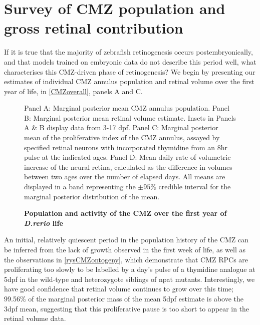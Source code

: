 \section{Survey of CMZ population and gross retinal contribution}

If it is true that the majority of zebrafish retinogenesis occurs postembryonically, and that models trained on embryonic data do not describe this period well, what characterises this CMZ-driven phase of retinogenesis? We begin by presenting our estimates of individual CMZ annulus population and retinal volume over the first year of life, in \autoref{CMZoverall}, panels A and C.

\begin{figure}[!h]
    \caption{{\bf Population and activity of the CMZ over the first year of \textit{D.rerio} life}}
    Panel A: Marginal posterior mean CMZ annulus population. Panel B: Marginal posterior mean retinal volume estimate. Insets in Panels A \& B display data from 3-17 dpf. Panel C: Marginal posterior mean of the proliferative index of the CMZ annulus, assayed by specified retinal neurons with incorporated thymidine from an 8hr pulse at the indicated ages. Panel D: Mean daily rate of volumetric increase of the neural retina, calculated as the difference in volumes between two ages over the number of elapsed days. All means are displayed in a band representing the $\pm 95 \%$ credible interval for the marginal posterior distribution of the mean.
    \label{CMZoverall}
\end{figure}

An initial, relatively quiescent period in the population history of the CMZ can be inferred from the lack of growth observed in the first week of life, as well as the observations in \autoref{rysCMZontogeny}, which demonstrate that CMZ RPCs are proliferating too slowly to be labelled by a day's pulse of a thymidine analogue at 5dpf in the wild-type and heterozygote siblings of npat mutants. Interestingly, we have good confidence that retinal volume continues to grow over this time; 99.56\% of the marginal posterior mass of the mean 5dpf estimate is above the 3dpf mean, suggesting that this proliferative pause is too short to appear in the retinal volume data.

